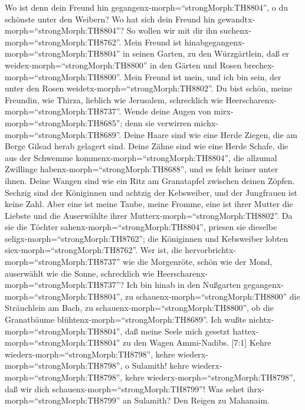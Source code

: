  Wo ist denn dein Freund hin
gegangenx-morph=``strongMorph:TH8804'', o du schönste unter den Weibern?
Wo hat sich dein Freund hin gewandtx-morph=``strongMorph:TH8804''? So
wollen wir mit dir ihn suchenx-morph=``strongMorph:TH8762''.
 Mein Freund ist hinabgegangenx-morph=``strongMorph:TH8804''
in seinen Garten, zu den Würzgärtlein, daß er
weidex-morph=``strongMorph:TH8800'' in den Gärten und Rosen
brechex-morph=``strongMorph:TH8800''.  Mein Freund ist mein,
und ich bin sein, der unter den Rosen
weidetx-morph=``strongMorph:TH8802''.  Du bist schön, meine
Freundin, wie Thirza, lieblich wie Jerusalem, schrecklich wie
Heerscharenx-morph=``strongMorph:TH8737''.  Wende deine
Augen von mirx-morph=``strongMorph:TH8685''; denn sie verwirren
michx-morph=``strongMorph:TH8689''. Deine Haare sind wie eine Herde
Ziegen, die am Berge Gilead herab gelagert sind.  Deine
Zähne sind wie eine Herde Schafe, die aus der Schwemme
kommenx-morph=``strongMorph:TH8804'', die allzumal Zwillinge
habenx-morph=``strongMorph:TH8688'', und es fehlt keiner unter ihnen.
 Deine Wangen sind wie ein Ritz am Granatapfel zwischen
deinen Zöpfen.  Sechzig sind der Königinnen und achtzig der
Kebsweiber, und der Jungfrauen ist keine Zahl.  Aber eine
ist meine Taube, meine Fromme, eine ist ihrer Mutter die Liebste und die
Auserwählte ihrer Mutterx-morph=``strongMorph:TH8802''. Da sie die
Töchter sahenx-morph=``strongMorph:TH8804'', priesen sie dieselbe
seligx-morph=``strongMorph:TH8762''; die Königinnen und Kebsweiber
lobten siex-morph=``strongMorph:TH8762''.  Wer ist, die
hervorbrichtx-morph=``strongMorph:TH8737'' wie die Morgenröte, schön wie
der Mond, auserwählt wie die Sonne, schrecklich wie
Heerscharenx-morph=``strongMorph:TH8737''?  Ich bin hinab
in den Nußgarten gegangenx-morph=``strongMorph:TH8804'', zu
schauenx-morph=``strongMorph:TH8800'' die Sträuchlein am Bach, zu
schauenx-morph=``strongMorph:TH8800'', ob die Granatbäume
blühtenx-morph=``strongMorph:TH8689''.  Ich wußte
nichtx-morph=``strongMorph:TH8804'', daß meine Seele mich gesetzt
hattex-morph=``strongMorph:TH8804'' zu den Wagen Ammi-Nadibs.
 {[}7:1{]} Kehre wiederx-morph=``strongMorph:TH8798'',
kehre wiederx-morph=``strongMorph:TH8798'', o Sulamith! kehre
wiederx-morph=``strongMorph:TH8798'', kehre
wiederx-morph=``strongMorph:TH8798'', daß wir dich
schauenx-morph=``strongMorph:TH8799''! Was sehet
ihrx-morph=``strongMorph:TH8799'' an Sulamith? Den Reigen zu Mahanaim.

